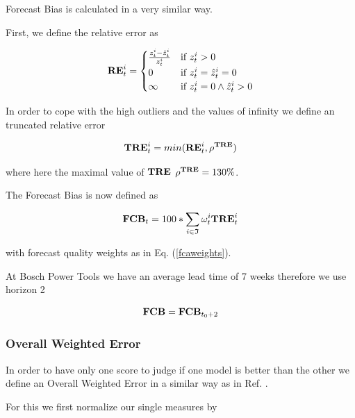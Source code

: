 \documentclass[11pt,headings=small]{scrartcl}
\begin{document}
Forecast Bias is calculated in a very similar way.


First, we define the relative error as 

\begin{equation}\label{re}
\textbf{RE}^{i}_{t} = 
\begin{cases}
\frac{z^{i}_{t} - \hat{z}^{i}_{t}}{z^{i}_{t}} 	& 	\text{if } z^{i}_{t} > 0 \\
0 															&	\text{if } z^{i}_{t} =\hat{z}^{i}_{t} = 0 \\
\infty 														&	\text{if } z^{i}_{t} = 0 \land \hat{z}^{i}_{t} > 0
\end{cases} 
\end{equation}

In order to cope with the high outliers and the values of infinity we define an truncated relative error

\begin{equation}\label{tare}
\textbf{TRE}^{i}_{t} = min(\textbf{RE}^{i}_{t},\rho^\textbf{TRE})
\end{equation}

where here the maximal value of $\textbf{TRE}$ $\rho^\textbf{TRE}=130\%$.

The Forecast Bias is now defined as

\begin{equation}\label{fca}
\textbf{FCB}_{t} = 100 * \sum_{i\in\frak{I}}\omega^{i}_{t}\textbf{TRE}^{i}_{t} 
\end{equation}

with forecast quality weights as in Eq. (\ref{fcaweights}).


At Bosch Power Tools we have an average lead time of 7 weeks therefore we use horizon 2 

\begin{equation}\label{fca2}
\textbf{FCB} = \textbf{FCB}_{t_{0} + 2}
\end{equation}

\subsubsection{Overall Weighted Error}
\label{subsubsection:OverallWeightedError}

In order to have only one score to judge if one model is better than the other we define an Overall Weighted Error in a similar way as in Ref. \cite{MAKRIDAKIS202054}.

For this we first normalize our single measures by
\end{document}
